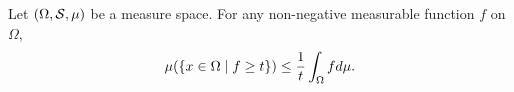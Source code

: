 \begin{theorem}
    Let $(\Omega, \S, \mu)$ be a measure space. For any 
    non-negative measurable function $f$ on $\Omega$, 
    \begin{equation*}
        \mu\pth{\Set{x\in\Omega}{f\geq t}} \leq \frac{1}{t}\int_\Omega fd\mu.
    \end{equation*}
\end{theorem}